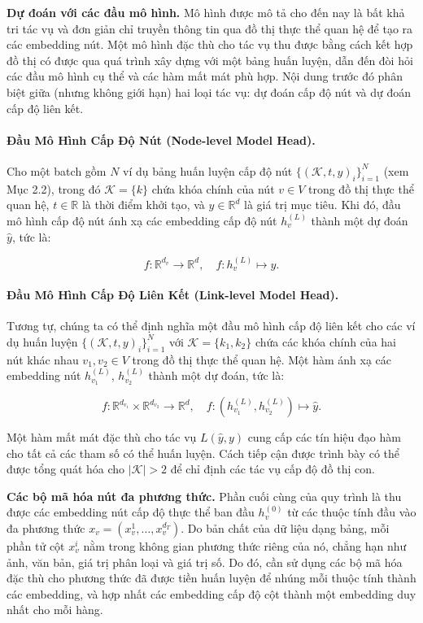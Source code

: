 \textbf{Dự đoán với các đầu mô hình.}
Mô hình được mô tả cho đến nay là bất khả tri tác vụ và đơn giản chỉ truyền thông tin qua đồ thị thực thể quan hệ để tạo ra các embedding nút. Một mô hình đặc thù cho tác vụ thu được bằng cách kết hợp đồ thị có được qua quá trình xây dựng với một bảng huấn luyện, dẫn đến đòi hỏi các đầu mô hình cụ thể và các hàm mất mát phù hợp. Nội dung trước đó phân biệt giữa (nhưng không giới hạn) hai loại tác vụ: dự đoán cấp độ nút và dự đoán cấp độ liên kết.

\paragraph{Đầu Mô Hình Cấp Độ Nút (Node-level Model Head).}
Cho một batch gồm $N$ ví dụ bảng huấn luyện cấp độ nút $\{(\mathcal{K}, t, y)_i\}_{i=1}^N$ (xem Mục 2.2), trong đó $\mathcal{K} = \{k\}$ chứa khóa chính của nút $v \in V$ trong đồ thị thực thể quan hệ, $t \in \mathbb{R}$ là thời điểm khởi tạo, và $y \in \mathbb{R}^d$ là giá trị mục tiêu. Khi đó, đầu mô hình cấp độ nút ánh xạ các embedding cấp độ nút $h_v^{(L)}$ thành một dự đoán $\hat{y}$, tức là:

\begin{equation}
f : \mathbb{R}^{d_v} \rightarrow \mathbb{R}^d, \quad f : h_v^{(L)} \mapsto \hat{y}.
\end{equation}

\paragraph{Đầu Mô Hình Cấp Độ Liên Kết (Link-level Model Head).}
Tương tự, chúng ta có thể định nghĩa một đầu mô hình cấp độ liên kết cho các ví dụ huấn luyện $\{(\mathcal{K}, t, y)_i\}_{i=1}^N$ với $\mathcal{K} = \{k_1, k_2\}$ chứa các khóa chính của hai nút khác nhau $v_1, v_2 \in V$ trong đồ thị thực thể quan hệ. Một hàm ánh xạ các embedding nút $h_{v_1}^{(L)}$, $h_{v_2}^{(L)}$ thành một dự đoán, tức là:

\begin{equation}
f : \mathbb{R}^{d_{v_1}} \times \mathbb{R}^{d_{v_2}} \rightarrow \mathbb{R}^d, \quad f : (h_{v_1}^{(L)}, h_{v_2}^{(L)}) \mapsto \hat{y}.
\end{equation}

Một hàm mất mát đặc thù cho tác vụ $L(\hat{y}, y)$ cung cấp các tín hiệu đạo hàm cho tất cả các tham số có thể huấn luyện. Cách tiếp cận được trình bày có thể được tổng quát hóa cho $|\mathcal{K}| > 2$ để chỉ định các tác vụ cấp độ đồ thị con.

\textbf{Các bộ mã hóa nút đa phương thức.}
Phần cuối cùng của quy trình là thu được các embedding nút cấp độ thực thể ban đầu $h_v^{(0)}$ từ các thuộc tính đầu vào đa phương thức $x_v = (x_v^1, \ldots, x_v^{d_T})$. Do bản chất của dữ liệu dạng bảng, mỗi phần tử cột $x_v^i$ nằm trong không gian phương thức riêng của nó, chẳng hạn như ảnh, văn bản, giá trị phân loại và giá trị số. Do đó, cần sử dụng các bộ mã hóa đặc thù cho phương thức đã được tiền huấn luyện để nhúng mỗi thuộc tính thành các embedding, và hợp nhất các embedding cấp độ cột thành một embedding duy nhất cho mỗi hàng.